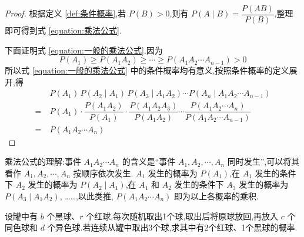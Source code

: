 \begin{proof}
    根据定义 \ref{def:条件概率},若 $P(B)>0$,则有 $P(A \mid B) = \dfrac{P(AB)}{P(B)}$,整理即可得到式 \eqref{equation:乘法公式}.

    下面证明式 \eqref{equation:一般的乘法公式}.因为
    $$
    P(A_1) \geqslant P(A_1 A_2) \geqslant \cdots \geqslant P(A_1 A_2 \cdots A_{n-1}) > 0
    $$
    所以式 \eqref{equation:一般的乘法公式} 中的条件概率均有意义,按照条件概率的定义展开,得
    $$
    \begin{aligned}
        & P(A_1) \, P(A_2 \mid A_1) \, P(A_3 \mid A_1 A_2) \cdots P(A_n \mid A_1 A_2 \cdots A_{n-1}) \\
        =\ & P(A_1) \cdot \dfrac{P(A_1 A_2)}{P(A_1)} \cdot \dfrac{P(A_1 A_2 A_3)}{P(A_1 A_2)} \cdots \dfrac{P(A_1 A_2 \cdots A_n)}{P(A_1 A_2 \cdots A_{n-1})} \\
        =\ & P(A_1 A_2 \cdots A_n)
    \end{aligned}
    $$
\end{proof}

\begin{note}
    \indent 乘法公式的理解:事件 $A_1 A_2 \cdots A_n$ 的含义是``事件 $A_1, A_2, \cdots, A_n$ 同时发生'',可以将其看作 $A_1, A_2, \cdots, A_n$ 按顺序依次发生. $A_1$ 发生的概率为 $P(A_1)$,在 $A_1$ 发生的条件下 $A_2$ 发生的概率为 $P(A_2 \mid A_1)$,在 $A_1$ 和 $A_2$ 发生的条件下 $A_3$ 发生的概率为 $P(A_3 \mid A_1 A_2)$, ……,以此类推, $P(A_1 A_2 \cdots A_n)$ 即为以上各概率的乘积.
\end{note}

\begin{example}[][波利亚罐子模型]
    \indent 设罐中有 $b$ 个黑球、$r$ 个红球,每次随机取出1个球,取出后将原球放回,再放入 $c$ 个同色球和 $d$ 个异色球.若连续从罐中取出3个球,求其中有2个红球、1个黑球的概率.
\end{example}

